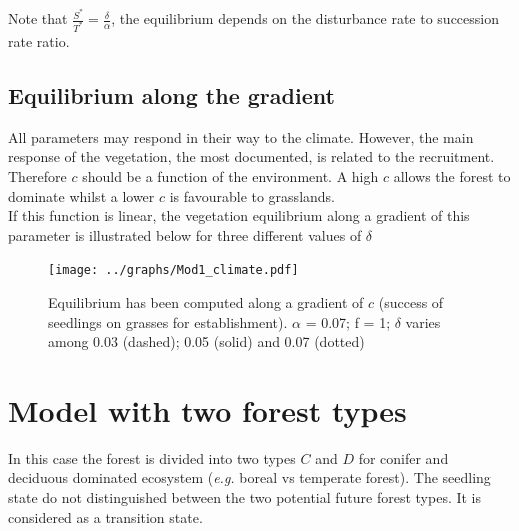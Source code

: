 Note that $\frac{S^\ast}{T^\ast} = \frac{\delta}{\alpha}$, the equilibrium
depends on the disturbance rate to succession rate ratio.

\newpage
\subsection*{Equilibrium along the gradient}

All parameters may respond in their way to the climate. However, the main
response of the vegetation, the most documented, is related to the
recruitment. Therefore $c$ should be a function of the environment. A high $c$
allows the forest to dominate whilst a lower $c$ is favourable to grasslands.
\\

If this function is linear, the vegetation equilibrium along a gradient of
this parameter is illustrated below for three different values of $\delta$

\begin{figure}[!h]
   \texttt{[image: ../graphs/Mod1\_climate.pdf]}

   \caption{Equilibrium has been computed along a gradient of $c$ (success of
seedlings on grasses for establishment). $\alpha$ = 0.07; f = 1; $\delta$
varies among 0.03 (dashed); 0.05 (solid) and 0.07 (dotted)}
\label{mod1Climate} 
\end{figure}





\newpage
\section{Model with two forest types}

In this case the forest is divided into two types $C$ and $D$ for conifer and
deciduous dominated ecosystem (\textit{e.g.} boreal vs temperate forest). The
seedling state do not distinguished between the two potential future forest
types. It is considered as a transition state.

